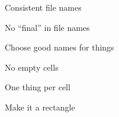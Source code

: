 \documentclass[aspectratio=169,12pt,t]{beamer}
\begin{document}
\begin{frame}[c]{Consistent file names}



  \note{

  }

\end{frame}



\begin{frame}[c]{No ``{\hilit final}'' in file names}

\vspace*{3mm}

\centering



\end{frame}




\begin{frame}[c]{Choose good names for things}



  \note{

  }

\end{frame}




\begin{frame}[c]{No empty cells}


  \note{
  }
\end{frame}




\begin{frame}[c]{One thing per cell}


  \note{
  }
\end{frame}




\begin{frame}[c]{Make it a rectangle}


  \note{
  }
\end{frame}
\end{document}
